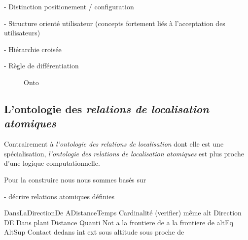 - Distinction positionement / configuration

- Structure orienté utilisateur (concepts fortement liés à
l'acceptation des utilisateurs)

- Hiérarchie croisée

- Règle de différentiation

\begin{figure}
  \centering
  \caption{Onto}
  \label{fig:ontho}
\end{figure}

\subsection{L'ontologie des \emph{relations de localisation atomiques}}

Contrairement à \emph{l'ontologie des relations de localisation} dont
elle est une spécialisation, \emph{l'ontologie des relations de
  localisation atomiques} est plus proche d'une logique
computationnelle.

Pour la construire nous nous sommes basés sur

- décrire relations atomiques définies

DansLaDirectionDe
ADistanceTemps
Cardinalité (verifier)
même alt
Direction DE
Dans plani
Distance Quanti
Not a la frontiere de
a la frontiere de
altEq
AltSup
Contact
dedans
int
ext
sous altitude
sous proche de 

